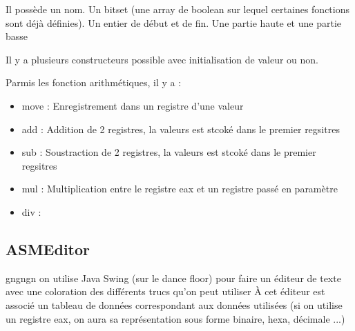 \documentclass{article}
\begin{document}
Il possède un nom.
Un bitset (une array de boolean sur lequel certaines fonctions sont déjà définies).
Un entier de début et de fin.
Une partie haute et une partie basse

Il y a plusieurs constructeurs possible avec initialisation de valeur ou non.

Parmis les fonction arithmétiques, il y a :
\begin{itemize}
    \item move : Enregistrement dans un registre d'une valeur
    \item add : Addition de 2 registres, la valeurs est stcoké dans le premier regsitres
    \item sub : Soustraction de 2 registres, la valeurs est stcoké dans le premier regsitres
    \item mul : Multiplication entre le registre eax et un registre passé en paramètre
    \item div :
\end{itemize}


\subsection{ASMEditor}
gngngn on utilise Java Swing (sur le dance floor) pour faire un éditeur de texte avec une coloration des différents trucs qu'on peut utiliser
À cet éditeur est associé un tableau de données correspondant aux données utilisées (si on utilise un registre eax, on aura sa représentation sous forme binaire, hexa, décimale ...)
\end{document}
